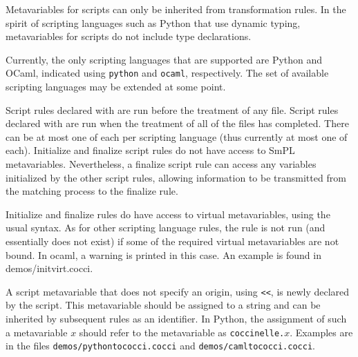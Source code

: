 Metavariables for scripts can only be inherited from transformation rules.
In the spirit of scripting languages such as Python that use dynamic
typing, metavariables for scripts do not include type declarations.

\begin{grammar}

    


\end{grammar}

Currently, the only scripting languages that are supported are Python and
OCaml, indicated using {\tt python} and {\tt ocaml}, respectively.  The
set of available scripting languages may be extended at some point.

Script rules declared with  are run before the treatment of
any file.  Script rules declared with  are run when the
treatment of all of the files has completed.  There can be at most one of
each per scripting language (thus currently at most one of each).
Initialize and finalize script rules do not have access to SmPL
metavariables.  Nevertheless, a finalize script rule can access any
variables initialized by the other script rules, allowing information to be
transmitted from the matching process to the finalize rule.

Initialize and finalize rules do have access to virtual metavariables,
using the usual syntax.  As for other scripting language rules, the rule
is not run (and essentially does not exist) if some of the required virtual
metavariables are not bound.  In ocaml, a warning is printed in this case.
An example is found in demos/initvirt.cocci.

A script metavariable that does not specify an origin, using \texttt{<<},
is newly declared by the script.  This metavariable should be assigned to a
string and can be inherited by subsequent rules as an identifier.  In
Python, the assignment of such a metavariable $x$ should refer to the
metavariable as {\tt coccinelle.\(x\)}.  Examples are in the files
\texttt{demos/pythontococci.cocci} and \texttt{demos/camltococci.cocci}.

